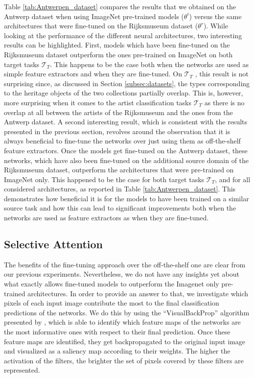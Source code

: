 Table \ref{tab:Antwerpen_dataset} compares the results that we obtained on the Antwerp dataset when using ImageNet pre-trained models ($\theta^{i}$) versus the same architectures that were fine-tuned on the Rijksmuseum dataset ($\theta^{r}$). While looking at the performance of the different neural architectures, two interesting results can be highlighted. First, models which have been fine-tuned on the Rijksmuseum dataset outperform the ones pre-trained on ImageNet on both target tasks $\mathcal{T}_T$. This happens to be the case both when the networks are used as simple feature extractors and when they are fine-tuned. On $\mathcal{T}_T$ , this result is not surprising since, as discussed in Section \ref{subsec:datasets}, the types corresponding to the heritage objects of the two collections partially overlap. This is, however, more surprising when it comes to the artist classification tasks $\mathcal{T}_T$  as there is no overlap at all between the artists of the Rijksmuseum and the ones from the Antwerp dataset.
A second interesting result, which is consistent with the results presented in the previous section, revolves around the observation that it is always beneficial to fine-tune the networks over just using them as off-the-shelf feature extractors. Once the models get fine-tuned on the Antwerp dataset, these networks, which have also been fine-tuned on the additional source domain of the Rijksmuseum dataset, outperform the architectures that were pre-trained on ImageNet only. This happened to be the case for both target tasks $\mathcal{T}_T$, and for all considered architectures, as reported in Table \ref{tab:Antwerpen_dataset}. This demonstrates how beneficial it is for the models to have been trained on a similar source task and how this can lead to significant improvements both when the networks are used as feature extractors as when they are fine-tuned. 



\subsection{Selective Attention}

The benefits of the fine-tuning approach over the off-the-shelf one are clear from our previous experiments. Nevertheless, we do not have any insights yet about what exactly allows fine-tuned models to outperform the Imagenet only pre-trained architectures. In order to provide an answer to that, we investigate which pixels of each input image contribute the most to the final classification predictions of the networks. We do this by using the ``VisualBackProp'' algorithm presented by \cite{bojarski2016visualbackprop}, which is able to identify which feature maps of the networks are the most informative ones with respect to their final prediction. Once these feature maps are identified, they get backpropagated to the original input image and visualized as a saliency map according to their weights. The higher the activation of the filters, the brighter the set of pixels covered by these filters are represented.

